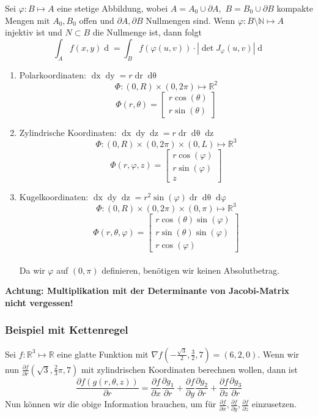 \documentclass[a4paper,10pt]{article}
\def\R{\mathbb{R}}
\def\N{\mathbb{N}}
\begin{document}
Sei \(\varphi : B \mapsto A\) eine stetige Abbildung, wobei \(A= A_0 \cup \partial A, \) \(B = B_0 \cup \partial B\) kompakte Mengen mit \(A_0, B_0\) offen und \(\partial A, \partial B\) Nullmengen sind. Wenn \(\varphi : B \setminus \N \mapsto A\) injektiv ist und \(N \subset B\) die Nullmenge ist, dann folgt
\[\int_A f(x,y) \mathop{d(x,y)} = \int_B f(\varphi(u,v)) \cdot \left|\det J_\varphi (u,v)\right| \mathop{d(u,v)}\]
\begin{enumerate}
  \item{
    Polarkoordinaten: \(\mathop{dx}\mathop{dy} = r \mathop{dr} \mathop{d\theta}\)\\
    $$\varPhi: (0, R) \times (0, 2\pi) \mapsto \R^2$$
    $$\varPhi(r, \theta) = \begin{bmatrix}
      r \cos(\theta) \\
      r \sin(\theta)
    \end{bmatrix}$$
  }
  \item{
    Zylindrische Koordinaten: \(\mathop{dx} \mathop{dy} \mathop{dz} = r \mathop{dr} \mathop{d\theta} \mathop{dz}\)\\
    $$\varPhi: (0, R) \times (0, 2\pi) \times (0, L) \mapsto \R^3$$
    $$\varPhi(r, \varphi, z) = \begin{bmatrix}
      r \cos(\varphi) \\
      r \sin(\varphi) \\
      z
    \end{bmatrix}$$
  }
  \item{
    Kugelkoordinaten: \(\mathop{dx}\mathop{dy}\mathop{dz} = r^2 \sin(\varphi) \mathop{dr} \mathop{d\theta} \mathop{d\varphi}\)\\
    $$\varPhi: (0, R) \times (0, 2\pi) \times (0, \pi) \mapsto \R^3$$
    $$\varPhi(r, \theta, \varphi) = \begin{bmatrix}
      r \cos(\theta) \sin(\varphi) \\
      r \sin(\theta) \sin(\varphi) \\
      r \cos(\varphi)
    \end{bmatrix}$$\\
    Da wir $\varphi$ auf $(0, \pi)$ definieren, benötigen wir keinen Absolutbetrag.
  }
\end{enumerate}

\textbf{Achtung: Multiplikation mit der Determinante von Jacobi-Matrix nicht vergessen!}

\subsubsection*{Beispiel mit Kettenregel}
Sei \(f: \R^3 \mapsto \R\) eine glatte Funktion mit \(\nabla f \left(-\frac{\sqrt{3}}{2}, \frac{3}{2},7\right) = (6,2,0)\). Wenn wir nun \(\frac{\partial f}{\partial r}\left(\sqrt{3}, \frac{2}{3}\pi, 7\right)\) mit zylindrischen Koordinaten berechnen wollen, dann ist
\[\frac{\partial f(g(r,\theta,z))}{\partial r} = \frac{\partial f}{\partial x} \frac{\partial g_1}{\partial r} + \frac{\partial f}{\partial y} \frac{\partial g_2}{\partial r} + \frac{\partial f}{\partial z} \frac{\partial g_3}{\partial r}\]
Nun können wir die obige Information brauchen, um für \(\frac{\partial f}{\partial x}, \frac{\partial f}{\partial y}, \frac{\partial f}{\partial z}\) einzusetzen.
\end{document}
